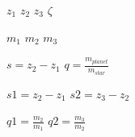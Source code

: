\documentclass[32pt]{article}
\begin{document}
\Huge
$z_{1}$ \qquad $z_{2}$ \qquad $z_{3}$ \qquad $\zeta$

\vspace*{\floatsep}
\vspace*{\floatsep}

$m_{1}$ \qquad $m_{2}$ \qquad $m_{3}$

\vspace*{\floatsep}
\vspace*{\floatsep}

$s=z_{2} - z_{1}$ \qquad $q=\frac{m_{planet}}{m_{star}}$

\vspace*{\floatsep}
\vspace*{\floatsep}

$s1=z_{2} - z_{1}$ \qquad $s2=z_{3} - z_{2}$

\vspace*{\floatsep}
\vspace*{\floatsep}

$q1=\frac{m_{2}}{m_{1}}$ \qquad $q2=\frac{m_{3}}{m_{2}}$


\end{document}
